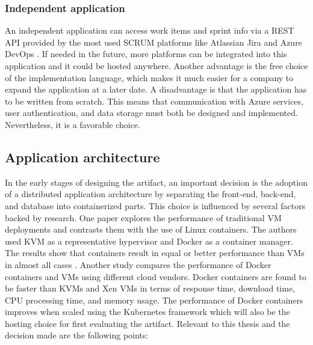 \subsubsection{Independent application}
An independent application can access work items and sprint info via a REST API provided by the most used SCRUM platforms like Atlassian Jira and Azure DevOps \parencite{TopTenScrum}. If needed in the future, more platforms can be integrated into this application and it could be hosted anywhere. Another advantage is the free choice of the implementation language, which makes it much easier for a company to expand the application at a later date. A disadvantage is that the application has to be written from scratch. This means that communication with Azure services, user authentication, and data storage must both be designed and implemented. Nevertheless, it is a favorable choice.

\subsection{Application architecture}

In the early stages of designing the artifact, an important decision is the adoption of a distributed application architecture by separating the front-end, back-end, and database into containerized parts. This choice is influenced by several factors backed by research. One paper explores the performance of traditional VM deployments and contrasts them with the use of Linux containers. The authors used KVM as a representative hypervisor and Docker as a container manager. The results show that containers result in equal or better performance than VMs in almost all cases \parencite{felter2015updated}. Another study compares the performance of Docker containers and VMs using different cloud vendors. Docker containers are found to be faster than KVMs and Xen VMs in terms of response time, download time, CPU processing time, and memory usage. The performance of Docker containers improves when scaled using the Kubernetes framework \parencite{chengeta2021comparing} which will also be the hosting choice for first evaluating the artifact. Relevant to this thesis and the decision made are the following points:

